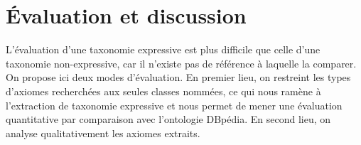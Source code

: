 \iffalse {
\subsubsection{Détails pratiques}

Axiomes vus comme des vecteurs bo   oléens. Le tout est vu comme une matrice booléenne, opérations rapides sur les lignes et les columns

Expliquer la traduction matricielle de $\cov, \spe, \xscore \ldots$


\subsection{Algorithme général}
\subsubsection{Vue d'ensemble}

Extraction de taxonomie à partir des axiomes

Choix des seuils

Discussion sur les paramètres

\subsubsection{Diminution du seuil}


\subsubsection{Phase finale}

Phase finale : ajout des classes manquantes (si disponible), restriction des patterns}
\fi 

\FloatBarrier

\section{Évaluation et discussion}


L'évaluation d'une taxonomie expressive est plus difficile
que celle d'une taxonomie non-expressive, car il n'existe pas de référence à laquelle la comparer. On propose ici deux modes d'évaluation. En premier lieu, on restreint les types d'axiomes recherchées aux seules classes nommées, ce qui nous ramène à l'extraction de taxonomie expressive et nous permet de mener une évaluation quantitative par comparaison avec l'ontologie DBpédia. En second lieu, on analyse qualitativement les axiomes extraits.

